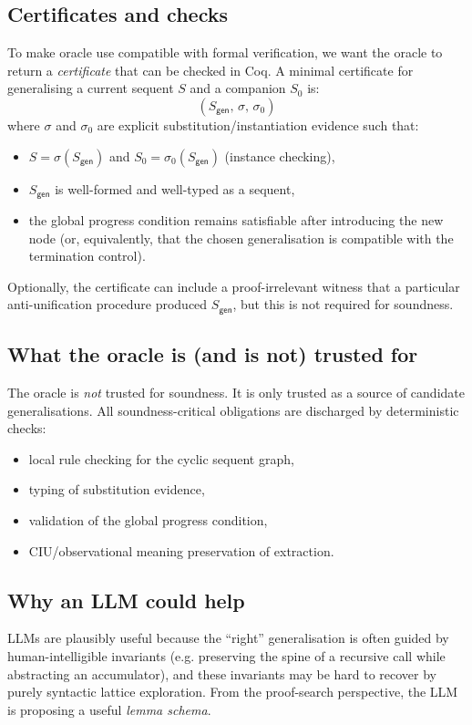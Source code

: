 \subsection{Certificates and checks}
To make oracle use compatible with formal verification, we want the oracle to return a \emph{certificate} that can be checked in Coq.
A minimal certificate for generalising a current sequent \(S\) and a companion \(S_0\) is:
\[
  (S_{\mathsf{gen}},\,\sigma,\,\sigma_0)
\]
where \(\sigma\) and \(\sigma_0\) are explicit substitution/instantiation evidence such that:
\begin{itemize}[leftmargin=*]
\item \(S = \sigma(S_{\mathsf{gen}})\) and \(S_0 = \sigma_0(S_{\mathsf{gen}})\) (instance checking),
\item \(S_{\mathsf{gen}}\) is well-formed and well-typed as a sequent,
\item the global progress condition remains satisfiable after introducing the new node (or, equivalently, that the chosen generalisation is compatible with the termination control).
\end{itemize}
Optionally, the certificate can include a proof-irrelevant witness that a particular anti-unification procedure produced \(S_{\mathsf{gen}}\), but this is not required for soundness.

\subsection{What the oracle is (and is not) trusted for}
The oracle is \emph{not} trusted for soundness.
It is only trusted as a source of candidate generalisations.
All soundness-critical obligations are discharged by deterministic checks:
\begin{itemize}[leftmargin=*]
\item local rule checking for the cyclic sequent graph,
\item typing of substitution evidence,
\item validation of the global progress condition,
\item CIU/observational meaning preservation of extraction.
\end{itemize}

\subsection{Why an LLM could help}
LLMs are plausibly useful because the ``right'' generalisation is often guided by human-intelligible invariants (e.g. preserving the spine of a recursive call while abstracting an accumulator), and these invariants may be hard to recover by purely syntactic lattice exploration.
From the proof-search perspective, the LLM is proposing a useful \emph{lemma schema}.

